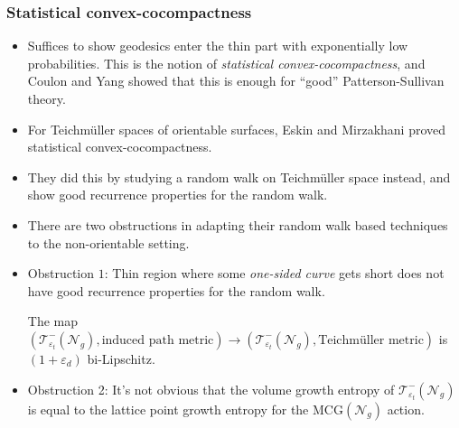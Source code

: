 \documentclass[8pt]{beamer}
\newcommand{\mcg}{\text{MCG}}
\newcommand{\no}{\mathcal{N}}
\begin{document}
\begin{frame}
\begin{columns}
\end{columns}
\end{frame}

\begin{frame}
  \frametitle{Statistical convex-cocompactness}
  \begin{itemize}
  \item<2-> Suffices to show geodesics enter the thin part with exponentially low probabilities. This is the notion of \emph{statistical convex-cocompactness}, and Coulon and Yang showed that this is enough for ``good'' Patterson-Sullivan theory.
  \item<3-> For Teichmüller spaces of orientable surfaces, Eskin and Mirzakhani proved statistical convex-cocompactness.
  \item<4-> They did this by studying a random walk on Teichmüller space instead, and show good recurrence properties for the random walk.
  \item<5-> There are two obstructions in adapting their random walk based techniques to the non-orientable setting.
  \item<6-> Obstruction $1$: Thin region where some \emph{one-sided curve} gets short does not have good recurrence properties for the random walk.
     {
      \begin{theorem}[K.]
        The map $(\mathcal{T}_{\varepsilon_t}^{-}(\no_g), \text{induced path metric}) \to (\mathcal{T}_{\varepsilon_t}^{-}(\no_g), \text{Teichmüller metric})$ is $(1 + \varepsilon_d)$ bi-Lipschitz.
      \end{theorem}
    }
  \item<8-> Obstruction 2: It's not obvious that the volume growth entropy of $\mathcal{T}_{\varepsilon_t}^{-}(\no_g)$ is equal to the lattice point growth entropy for the $\mcg(\no_g)$ action.
  \end{itemize}
\end{frame}
\end{document}
